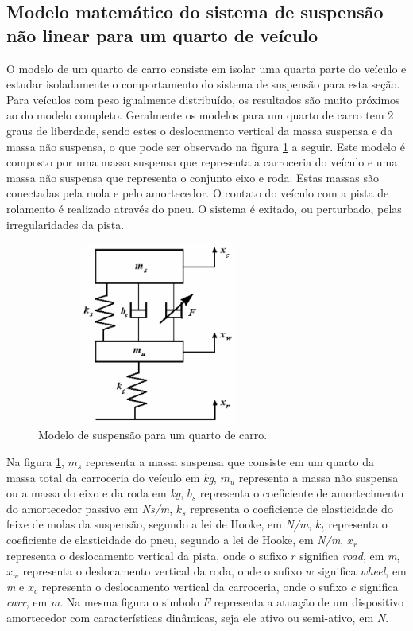 \subsection{Modelo matemático do sistema de suspensão não linear para um quarto de veículo }
O modelo de um quarto de carro consiste em isolar uma quarta parte do veículo e estudar isoladamente o comportamento do sistema de suspensão para esta seção. Para veículos com peso igualmente distribuído, os resultados são muito próximos ao do modelo completo. Geralmente os modelos para um quarto de carro tem 2 graus de liberdade, sendo estes o deslocamento vertical da massa suspensa e da massa não suspensa, o que pode ser observado na figura \ref{fig:massa_mola_nao_linear_controlavel} a seguir. Este modelo é composto por uma massa suspensa que representa a carroceria do veículo e uma massa não suspensa que representa o conjunto eixo e roda. Estas massas são conectadas pela mola e pelo amortecedor. O contato do veículo com a pista de rolamento é realizado através do pneu. O sistema é exitado, ou perturbado, pelas irregularidades da pista.
\FloatBarrier
\begin{figure}[htbp]
    \begin{centering}
        \includegraphics[width=8cm,height=6cm]{img/massa_mola_nao_linear_controlavel.png}
        \caption{Modelo de suspensão para um quarto de carro.} 
        \label{fig:massa_mola_nao_linear_controlavel}
    \end{centering}
\end{figure}
\FloatBarrier
Na figura \ref{fig:massa_mola_nao_linear_controlavel}, $m_s$ representa a massa suspensa que consiste em um quarto da massa total da carroceria do veículo em \emph{kg}, $m_u$ representa a massa não suspensa ou a massa do eixo e da roda em \emph{kg}, $b_s$ representa o coeficiente de amortecimento do amortecedor passivo em \emph{Ns/m}, $k_s$ representa o coeficiente de elasticidade do feixe de molas da suspensão, segundo a lei de Hooke, em \emph{N/m}, $k_t$ representa o coeficiente de elasticidade do pneu, segundo a lei de Hooke, em \emph{N/m}, $x_r$ representa o deslocamento vertical da pista, onde o sufixo $r$ significa \emph{road}, em \emph{m}, $x_w$ representa o deslocamento vertical da roda, onde o sufixo $w$ significa \emph{wheel}, em \emph{m} e $x_c$ representa o deslocamento vertical da carroceria, onde o sufixo $c$ significa \emph{carr}, em \emph{m}. Na mesma figura o simbolo $F$ representa a atuação de um dispositivo amortecedor com características dinâmicas, seja ele ativo ou semi-ativo, em \emph{N}.
    

